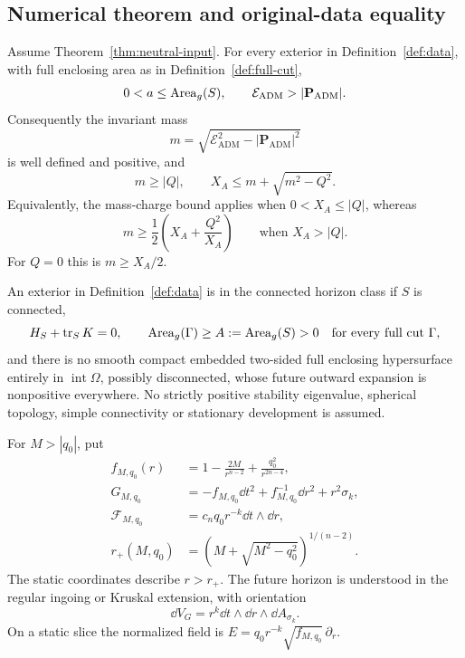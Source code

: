 \subsection{Numerical theorem and original-data equality}

\begin{theorem}\label{thm:numerical}
Assume Theorem~\ref{thm:neutral-input}. For every exterior in Definition~\ref{def:data}, with full enclosing area as in Definition~\ref{def:full-cut},
\begin{equation}\label{eq:numerical-conclusions}
 0<a\le\operatorname{Area}_g(S),\qquad
 \mathcal E_{\mathrm{ADM}}>|\mathbf P_{\mathrm{ADM}}|.
\end{equation}
Consequently the invariant mass
\[
 m=\sqrt{\mathcal E_{\mathrm{ADM}}^2-|\mathbf P_{\mathrm{ADM}}|^2}
\]
is well defined and positive, and
\begin{equation}\label{eq:charged-bound}
 m\ge |Q|,\qquad X_A\le m+\sqrt{m^2-Q^2}.
\end{equation}
Equivalently, the mass-charge bound applies when $0<X_A\le|Q|$, whereas
\begin{equation}\label{eq:polynomial-branch}
 m\ge\frac12\left(X_A+\frac{Q^2}{X_A}\right)
 \qquad\text{when }X_A>|Q|.
\end{equation}
For $Q=0$ this is $m\ge X_A/2$.
\end{theorem}

\begin{definition}\label{def:rigidity-class}
An exterior in Definition~\ref{def:data} is in the connected horizon class if $S$ is connected,
\begin{equation}\label{eq:horizon-hypotheses}
 H_S+\operatorname{tr}_SK=0,\qquad
 \operatorname{Area}_g(\Gamma)\ge A:=\operatorname{Area}_g(S)>0
 \quad\text{for every full cut }\Gamma,
\end{equation}
and there is no smooth compact embedded two-sided full enclosing hypersurface entirely in $\operatorname{int}\Omega$, possibly disconnected, whose future outward expansion is nonpositive everywhere. No strictly positive stability eigenvalue, spherical topology, simple connectivity or stationary development is assumed.
\end{definition}

For $M>|q_0|$, put
\begin{equation}\label{eq:rnt-model}
 \begin{split}
 f_{M,q_0}(r)&=1-\frac{2M}{r^{n-2}}+\frac{q_0^2}{r^{2n-4}},\\
 G_{M,q_0}&=-f_{M,q_0}\dd t^2+f_{M,q_0}^{-1}\dd r^2+r^2\sigma_k,\\
 \mathcal F_{M,q_0}&=c_nq_0r^{-k}\dd t\wedge\dd r,\\
 r_+(M,q_0)&=\left(M+\sqrt{M^2-q_0^2}\right)^{1/(n-2)}.
 \end{split}
\end{equation}
The static coordinates describe $r>r_+$. The future horizon is understood in the regular ingoing or Kruskal extension, with orientation
\[
 \dd V_G=r^k\dd t\wedge\dd r\wedge\dd A_{\sigma_k}.
\]
On a static slice the normalized field is
$E=q_0r^{-k}\sqrt{f_{M,q_0}}\,\partial_r$.

